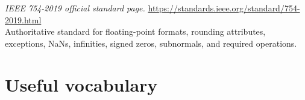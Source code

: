 \documentclass[manuscript, nonacm]{acmart}
\begin{document}
  \emph{IEEE 754-2019 official standard page.}
  \url{https://standards.ieee.org/standard/754-2019.html}\\
  Authoritative standard for floating-point formats, rounding attributes,
  exceptions, NaNs, infinities, signed zeros, subnormals, and required
  operations.

  
  

  \appendix


  \section{Useful vocabulary}
\end{document}
